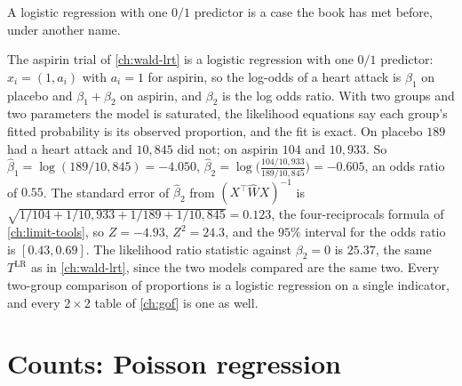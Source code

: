 A logistic regression with one $0/1$ predictor is a case the book has met before, under another name.

\begin{bridge}
The aspirin trial of \cref{ch:wald-lrt} is a logistic regression with one $0/1$ predictor: $x_i = (1, a_i)$ with $a_i = 1$ for aspirin, so the log-odds of a heart attack is $\beta_1$ on placebo and $\beta_1 + \beta_2$ on aspirin, and $\beta_2$ is the log odds ratio. With two groups and two parameters the model is saturated, the likelihood equations say each group's fitted probability is its observed proportion, and the fit is exact. On placebo $189$ had a heart attack and $10{,}845$ did not; on aspirin $104$ and $10{,}933$. So $\hat{\beta}_1 = \log(189/10{,}845) = -4.050$, $\hat{\beta}_2 = \log\big(\frac{104/10{,}933}{189/10{,}845}\big) = -0.605$, an odds ratio of $0.55$. The standard error of $\hat{\beta}_2$ from $(X^\top\hat{W}X)^{-1}$ is $\sqrt{1/104 + 1/10{,}933 + 1/189 + 1/10{,}845} = 0.123$, the four-reciprocals formula of \cref{ch:limit-tools}, so $Z = -4.93$, $Z^2 = 24.3$, and the $95\%$ interval for the odds ratio is $[0.43, 0.69]$. The likelihood ratio statistic against $\beta_2 = 0$ is $25.37$, the same $T^{\mathrm{LR}}$ as in \cref{ch:wald-lrt}, since the two models compared are the same two. Every two-group comparison of proportions is a logistic regression on a single indicator, and every $2 \times 2$ table of \cref{ch:gof} is one as well.
\end{bridge}

\section{Counts: Poisson regression}
\label{sec:glm-poisson}

